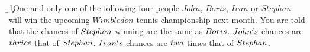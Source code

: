 
\ADD\vbnine\vbten\a
\ADD{}\b
\SUBTRACT\b{1}\c

\question One and only one of the following four people $John$, $Boris$, 
$Ivan$ or $Stephan$ will win the upcoming $Wimbledon$ tennis championship 
next month. You are told that the chances of $Stephan$ winning are the 
same as $Boris$. $John's$ chances are $thrice$ that of $Stephan$. 
$Ivan's$ chances are $two$ times that of $Stephan$.

\watchout


